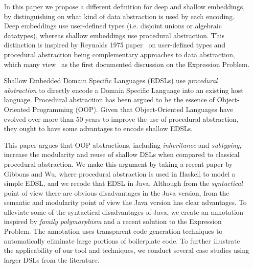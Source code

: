 In this paper we propose a different definition for deep and shallow
embeddings, by distinguishing on what kind of data abstraction is used
by each encoding. Deep embeddings use user-defined types
(i.e. disjoint unions or algebraic datatypes), whereas shallow
embeddings use procedural abstraction. This distinction is inspired by
Reynolds 1975 paper~\cite{} on user-defined types and procedural
abstraction being complementary approaches to data abstraction, which
many view~\cite{} as the first documented discussion on the Expression
Problem. 



Shallow Embedded Domain Specific Languages (EDSLs) use
\emph{procedural abstraction} to directly encode a Domain Specific
Language into an existing host language. Procedural abstraction has
been argued to be the essence of Object-Oriented Programming (OOP). Given
that Object-Oriented Languages have evolved over more than 50 years 
to improve the use of procedural abstraction, they ought to have some 
advantages to encode shallow EDSLs. 

This paper argues that OOP abstractions, including \emph{inheritance}
and \emph{subtyping}, increase the modularity and reuse of shallow
DSLs when compared to classical procedural abstraction. We make this
argument by taking a recent paper by Gibbons and Wu, where procedural
abstraction is used in Haskell to model a simple EDSL, and we recode
that EDSL in Java. Although from the \emph{syntactical} point of view
there are obvious disadvantages in the Java version, from the semantic
and modularity point of view the Java version has clear advantages.
To alleviate some of the syntactical disadvantages of Java, we create
an annotation inspired by \emph{family polymorphism} and a recent
solution to the Expression Problem. 
The annotation uses transparent code generation techniques to
automatically eliminate large portions of boilerplate code.
To further illustrate the applicability of our tool and techniques, we conduct 
several case studies using larger DSLs from the literature. 